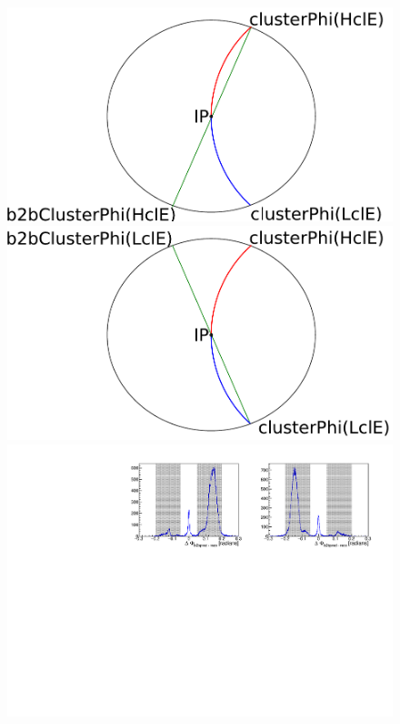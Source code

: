 \documentclass[a4paper,11pt,twosided,final,german,openbib,pdftex,listof=totoc,bibliography=totoc]{scrbook}
\begin{document}
\begin{figure}[h!]
	

\begin{minipage}[b]{\textwidth}
\centering


	\begin{minipage}[b]{0.45\linewidth}
		\centering
		\includegraphics[width=\textwidth]{Bilder/b2b_2}

	\end{minipage}
	\hspace{0.5cm}
	\begin{minipage}[b]{0.45\linewidth}
		\centering
		\includegraphics[width=\textwidth]{Bilder/b2b_3}
	\end{minipage}
	\includegraphics[width=\textwidth]{Plots/master/sb2b_Data.pdf}
	


\end{minipage}
\end{figure}
\end{document}

